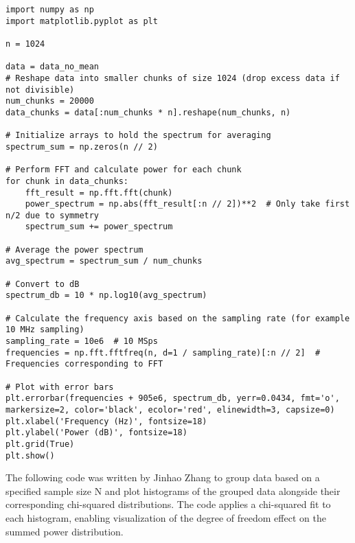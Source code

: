 \documentclass[10pt, preprint]{aastex}
\begin{document}
\begin{verbatim}
import numpy as np
import matplotlib.pyplot as plt

n = 1024

data = data_no_mean
# Reshape data into smaller chunks of size 1024 (drop excess data if not divisible)
num_chunks = 20000
data_chunks = data[:num_chunks * n].reshape(num_chunks, n)

# Initialize arrays to hold the spectrum for averaging
spectrum_sum = np.zeros(n // 2)

# Perform FFT and calculate power for each chunk
for chunk in data_chunks:
    fft_result = np.fft.fft(chunk)
    power_spectrum = np.abs(fft_result[:n // 2])**2  # Only take first n/2 due to symmetry
    spectrum_sum += power_spectrum

# Average the power spectrum
avg_spectrum = spectrum_sum / num_chunks

# Convert to dB
spectrum_db = 10 * np.log10(avg_spectrum)

# Calculate the frequency axis based on the sampling rate (for example 10 MHz sampling)
sampling_rate = 10e6  # 10 MSps
frequencies = np.fft.fftfreq(n, d=1 / sampling_rate)[:n // 2]  # Frequencies corresponding to FFT

# Plot with error bars
plt.errorbar(frequencies + 905e6, spectrum_db, yerr=0.0434, fmt='o', markersize=2, color='black', ecolor='red', elinewidth=3, capsize=0)
plt.xlabel('Frequency (Hz)', fontsize=18)
plt.ylabel('Power (dB)', fontsize=18)
plt.grid(True)
plt.show()
\end{verbatim}

The following code was written by Jinhao Zhang to group data based on a specified sample size N and plot histograms of the grouped data alongside their corresponding chi-squared distributions. The code applies a chi-squared fit to each histogram, enabling visualization of the degree of freedom effect on the summed power distribution.
\end{document}
